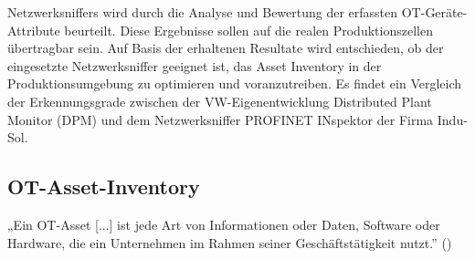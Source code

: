 Netzwerksniffers wird durch die Analyse und Bewertung der erfassten OT-Geräte-Attribute beurteilt. Diese Ergebnisse sollen auf die realen Produktionszellen übertragbar sein. Auf Basis der erhaltenen Resultate wird entschieden, ob der eingesetzte Netzwerksniffer geeignet ist, das Asset Inventory in der Produktionsumgebung zu optimieren und voranzutreiben. Es findet ein Vergleich der Erkennungsgrade zwischen der VW-Eigenentwicklung Distributed Plant Monitor (DPM) und dem Netzwerksniffer PROFINET INspektor der Firma Indu-Sol.

\subsection{OT-Asset-Inventory}

  „Ein OT-Asset [...] ist jede Art von Informationen oder Daten, Software oder Hardware, die ein Unternehmen im Rahmen seiner Geschäftstätigkeit nutzt.'' (\cite{IBM})

